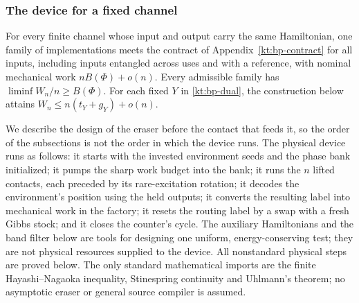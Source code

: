 \subsubsection{The device for a fixed channel}
\begin{theorem}\label{kt:bp-batch}
For every finite channel whose input and output carry the same Hamiltonian, one family of
implementations meets the contract of Appendix~\ref{kt:bp-contract} for all inputs, including inputs
entangled across uses and with a reference, with nominal mechanical work $nB(\Phi)+o(n)$. Every admissible family has $\liminf W_n/n\ge B(\Phi)$.
For each fixed $Y$ in \eqref{kt:bp-dual}, the construction below attains
$W_n\le n(t_Y+g_Y)+o(n)$.
\end{theorem}
We describe the design of the eraser before the contact that feeds it, so the order of the subsections is not the order in which the device runs. The physical device runs as follows: it starts with the invested environment seeds and the phase bank initialized; it pumps the sharp work budget into the bank; it runs the $n$ lifted contacts, each preceded by its rare-excitation rotation; it decodes the environment's position using the held outputs; it converts the resulting label into mechanical work in the factory; it resets the routing label by a swap with a fresh Gibbs stock; and it closes the counter's cycle. The auxiliary Hamiltonians and the band filter below are tools for designing one uniform, energy-conserving test; they are not physical resources supplied to the device. All nonstandard physical steps are proved below. The only standard
mathematical imports are the finite Hayashi--Nagaoka inequality,
Stinespring continuity and Uhlmann's theorem; no asymptotic eraser
or general source compiler is assumed.

